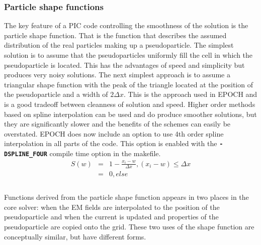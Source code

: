 \documentclass[12pt]{article}
\newcommand{\inlinecode}[1]{{\color{warwickred} \bf\texttt{#1}}}
\newcommand{\nEPOCH}{{\color{warwickdark}\fontfamily{phv}\selectfont EPOCH}}
\newcommand{\EPOCH}{{\nEPOCH} }
\begin{document}
\subsubsection{Particle shape functions}
The key feature of a PIC code controlling the smoothness of the solution is the
particle shape function. That is the function that describes the assumed
distribution of the real particles making up a pseudoparticle. The simplest
solution is to assume that the pseudoparticles uniformly fill the cell in which
the pseudoparticle is located. This has the advantages of speed and simplicity
but produces very noisy solutions. The next simplest approach is to assume a
triangular shape function with the peak of the triangle located at the position
of the pseudoparticle and a width of $ 2 \Delta x$. This is the approach used
in \EPOCH and is a good tradeoff between cleanness of solution and
speed. Higher order methods based on spline interpolation can be used and do
produce smoother solutions, but they are significantly slower and the benefits
of the schemes can easily be overstated. \EPOCH does now include an option to
use 4th order spline interpolation in all parts of the code. This option is
enabled with the \inlinecode{-DSPLINE\_FOUR} compile time option in the
makefile.\\
\begin{eqnarray*}
S(w)&=&1-\frac{x_i-w}{\Delta x}, (x_i-w) \le \Delta x\\
&=&0, else\\
\end{eqnarray*}
\\
Functions derived from the particle shape function appears in two places in the
core solver: when the EM fields are interpolated to the position of the
pseudoparticle and when the current is updated and properties of the
pseudoparticle are copied onto the grid. These two uses of the shape function
are conceptually similar, but have different forms.
\end{document}
